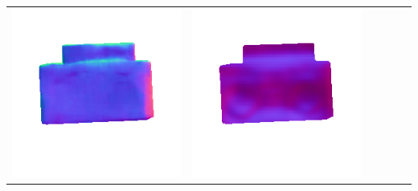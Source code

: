 \begin{center}
\begin{tabularx}{\linewidth}{@{}Y@{}Y@{}Y@{}Y@{}Y@{}Y@{}}
\includegraphics[width=\linewidth]{semisynthetic/20160617_19_marrnet_out.png} &
\includegraphics[width=\linewidth]{semisynthetic/20160617_19_ef_out.png} \\

\end{tabularx}
\end{center}
